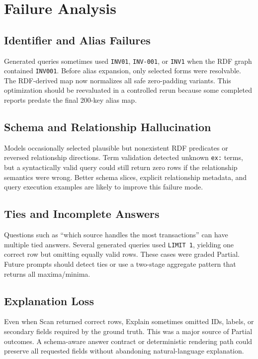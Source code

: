 \documentclass[11pt]{article}
\begin{document}
\section{Failure Analysis}

\subsection{Identifier and Alias Failures}

Generated queries sometimes used \texttt{INV01}, \texttt{INV-001}, or \texttt{INV1} when the RDF graph contained \texttt{INV001}. Before alias expansion, only selected forms were resolvable. The RDF-derived map now normalizes all safe zero-padding variants. This optimization should be reevaluated in a controlled rerun because some completed reports predate the final 200-key alias map.

\subsection{Schema and Relationship Hallucination}

Models occasionally selected plausible but nonexistent RDF predicates or reversed relationship directions. Term validation detected unknown \texttt{ex:} terms, but a syntactically valid query could still return zero rows if the relationship semantics were wrong. Better schema slices, explicit relationship metadata, and query execution examples are likely to improve this failure mode.

\subsection{Ties and Incomplete Answers}

Questions such as ``which source handles the most transactions'' can have multiple tied answers. Several generated queries used \texttt{LIMIT 1}, yielding one correct row but omitting equally valid rows. These cases were graded Partial. Future prompts should detect ties or use a two-stage aggregate pattern that returns all maxima/minima.

\subsection{Explanation Loss}

Even when Scan returned correct rows, Explain sometimes omitted IDs, labels, or secondary fields required by the ground truth. This was a major source of Partial outcomes. A schema-aware answer contract or deterministic rendering path could preserve all requested fields without abandoning natural-language explanation.
\end{document}
